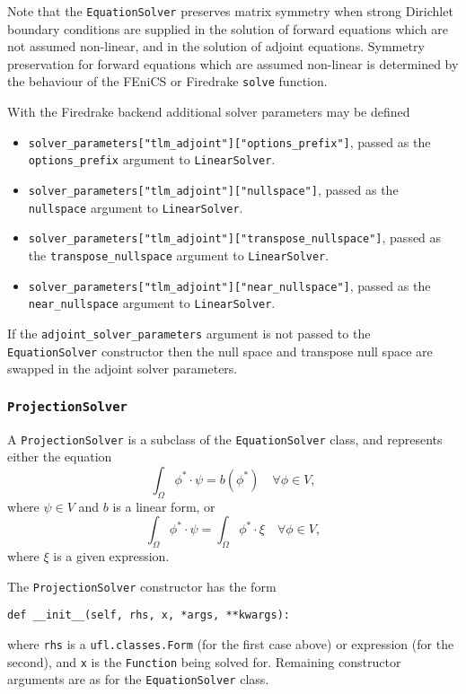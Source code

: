 \documentclass[11pt]{article}
\begin{document}
Note that the \texttt{EquationSolver} preserves matrix symmetry when strong
Dirichlet boundary conditions are supplied in the solution of forward equations
which are not assumed non-linear, and in the solution of adjoint equations.
Symmetry preservation for forward equations which are assumed non-linear is
determined by the behaviour of the FEniCS or Firedrake \texttt{solve} function.

With the Firedrake backend additional solver parameters may be defined
\begin{itemize}
  \item \texttt{solver\_parameters["tlm\_adjoint"]["options\_prefix"]}, passed
    as the \texttt{options\_prefix} argument to \texttt{LinearSolver}.
  \item \texttt{solver\_parameters["tlm\_adjoint"]["nullspace"]},
    passed as the \texttt{nullspace} argument to \texttt{LinearSolver}. 
  \item \texttt{solver\_parameters["tlm\_adjoint"]["transpose\_nullspace"]},
    passed as the \texttt{transpose\_nullspace} argument to
    \texttt{LinearSolver}. 
  \item \texttt{solver\_parameters["tlm\_adjoint"]["near\_nullspace"]}, passed
    as the \texttt{near\_nullspace} argument to \texttt{LinearSolver}. 
\end{itemize}
If the \texttt{adjoint\_solver\_parameters} argument is not passed to the
\texttt{EquationSolver} constructor then the null space and transpose null
space are swapped in the adjoint solver parameters.

\subsubsection{\texttt{ProjectionSolver}}

A \texttt{ProjectionSolver} is a subclass of the \texttt{EquationSolver} class,
and represents either the equation
\begin{equation*}
  \int_\Omega \phi^* \cdot \psi = b \left( \phi^* \right) \quad \forall \phi \in V,
\end{equation*}
where $\psi \in V$ and $b$ is a linear form, or
\begin{equation*}
  \int_\Omega \phi^* \cdot \psi = \int_\Omega \phi^* \cdot \xi \quad \forall \phi \in V,
\end{equation*}
where $\xi$ is a given expression.

The \texttt{ProjectionSolver} constructor has the form
\begin{lstlisting}
def __init__(self, rhs, x, *args, **kwargs):
\end{lstlisting}
where \texttt{rhs} is a \texttt{ufl.classes.Form} (for the first case above) or
expression (for the second), and \texttt{x} is the \texttt{Function} being
solved for. Remaining constructor arguments are as for the
\texttt{EquationSolver} class.
\end{document}

